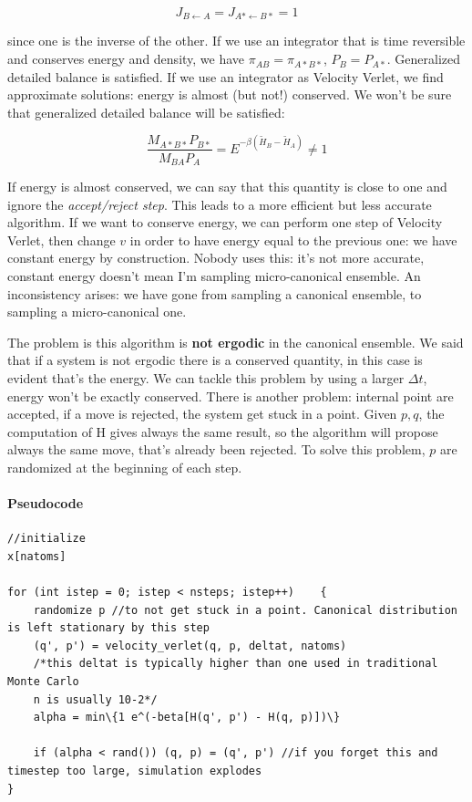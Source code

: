 \documentclass[a4paper, italian, openany]{book}
\begin{document}
$$J_{B \leftarrow A} = J_{A* \leftarrow B*} = 1$$

since one is the inverse of the other.\newline
If we use an integrator that is time reversible and conserves energy and density, we have $\pi_{AB} = \pi_{A*B*}$, $P_B = P_{A*}$. Generalized detailed balance is satisfied.\newline
If we use an integrator as Velocity Verlet, we find approximate solutions: energy is almost (but not!) conserved. We won't be sure that generalized detailed balance will be satisfied:

$$\frac{M_{A*B*}P_{B*}}{M_{BA}P_A} = E^{-\beta \left ( \tilde{H}_B - \tilde{H}_A \right )} \ne 1$$

If energy is almost conserved, we can say that this quantity is close to one and ignore the \textit{accept/reject step}. This leads to a more efficient but less accurate algorithm.\newline
If we want to conserve energy, we can perform one step of Velocity Verlet, then change $v$ in order to have energy equal to the previous one: we have constant energy by construction. Nobody uses this: it's not more accurate, constant energy doesn't mean I'm sampling micro-canonical ensemble.\newline
An inconsistency arises: we have gone from sampling a canonical ensemble, to sampling a micro-canonical one.


The problem is this algorithm is \textbf{not ergodic} in the canonical ensemble. We said that if a system is not ergodic there is a conserved quantity, in this case is evident that's the energy.\newline
We can tackle this problem by using a larger $\Delta t$, energy won't be exactly conserved. There is another problem: internal point are accepted, if a move is rejected, the system get stuck in a point. Given $p,q$, the computation of H gives always the same result, so the algorithm will propose always the same move, that's already been rejected. To solve this problem, $p$ are randomized at the beginning of each step.

\paragraph{Pseudocode}

\begin{lstlisting}
//initialize
x[natoms]

for (int istep = 0; istep < nsteps; istep++)	{
	randomize p //to not get stuck in a point. Canonical distribution is left stationary by this step
	(q', p') = velocity_verlet(q, p, deltat, natoms)
	/*this deltat is typically higher than one used in traditional Monte Carlo
	n is usually 10-2*/
	alpha = min\{1 e^(-beta[H(q', p') - H(q, p)])\}
	
	if (alpha < rand())	(q, p) = (q', p') //if you forget this and timestep too large, simulation explodes
}
\end{lstlisting}
\end{document}
